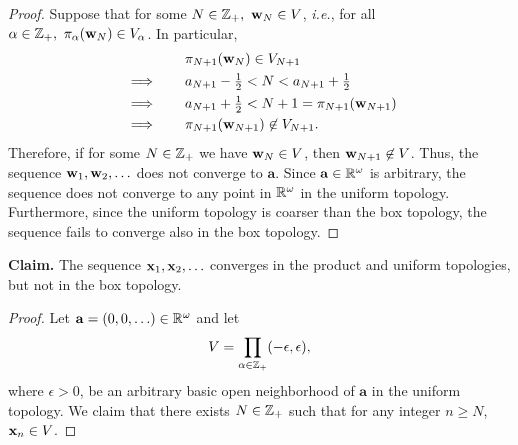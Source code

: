 \begin{solution}
\begin{proof}
        Suppose that for some $N \in \mathbb{Z}_+,~ \mathbf{w}_N \in V$, \textit{i.e.}, for all $\alpha \in \mathbb{Z}_+,~ \pi_\alpha(\mathbf{w}_N) \in V_\alpha$.
        In particular,
        \begin{alignat*}{2}
            &           && \quad \pi_{N+1}(\mathbf{w}_N) \in V_{N+1} \\
            & \implies  && \quad a_{N+1} - \tfrac{1}{2} < N < a_{N+1} + \tfrac{1}{2} \\
            & \implies  && \quad a_{N+1} + \tfrac{1}{2} < N + 1 = \pi_{N+1}(\mathbf{w}_{N+1}) \\
            & \implies  && \quad \pi_{N+1}(\mathbf{w}_{N+1}) \not\in V_{N+1}.
        \end{alignat*}
        Therefore, if for some $N \in \mathbb{Z}_+$ we have $\mathbf{w}_N \in V$, then $\mathbf{w}_{N+1} \not\in V$.
        Thus, the sequence $\mathbf{w}_1, \mathbf{w}_2, \ldots$ does not converge to $\mathbf{a}$.
        Since $\mathbf{a} \in \mathbb{R}^\omega$ is arbitrary, the sequence does not converge to any point in $\mathbb{R}^\omega$ in the uniform topology.
        Furthermore, since the uniform topology is coarser than the box topology, the sequence fails to converge also in the box topology.
    \end{proof}
    \bigskip

    \textbf{Claim.} The sequence $\mathbf{x}_1, \mathbf{x}_2, \ldots$ converges in the product and uniform topologies, but not in the box topology.
    \begin{proof}
        Let $\mathbf{a} = (0, 0, \ldots) \in \mathbb{R}^\omega$ and let
        \begin{equation*}
            V = \prod_{\alpha \in \mathbb{Z}_+} (-\epsilon, \epsilon),
        \end{equation*}
        where $\epsilon > 0$, be an arbitrary basic open neighborhood of $\mathbf{a}$ in the uniform topology.
        We claim that there exists $N \in \mathbb{Z}_+$ such that for any integer $n \geq N$, $\mathbf{x}_n \in V$.


\end{proof}
\end{solution}
